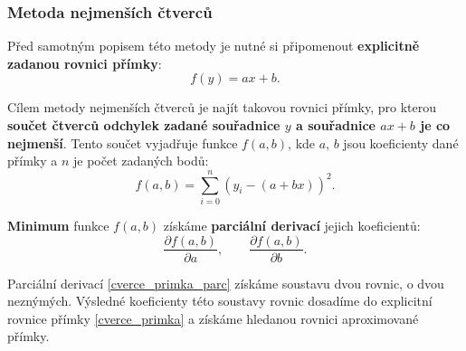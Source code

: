 \subsubsection{Metoda nejmenších čtverců}
Před samotným popisem této metody je nutné si připomenout \textbf{explicitně zadanou rovnici přímky}:
\begin{equation}\label{cverce_primka}
f(y) = ax + b.
\end{equation}

Cílem metody nejmenších čtverců je najít takovou rovnici přímky, pro kterou \textbf{součet čtverců odchylek zadané souřadnice $y$ a souřadnice $ax + b$ je co nejmenší}. Tento součet vyjadřuje funkce $f(a,b)$, kde $a$, $b$ jsou koeficienty dané přímky a $n$ je počet zadaných bodů:
\begin{equation}\label{ctverce_suma}
f(a,b) = \sum_{i=0}^{n}(y_i - (a + bx))^2.
\end{equation}

\textbf{Minimum} funkce $f(a,b)$ získáme \textbf{parciální derivací} jejich koeficientů:
\begin{equation}\label{cverce_primka_parc}
\dfrac{\partial f(a,b)}{\partial a}, \quad \quad \dfrac{\partial f(a,b)}{\partial b}.
\end{equation}

Parciální derivací \eqref{cverce_primka_parc} získáme soustavu dvou rovnic, o dvou neznýmých. Výsledné koeficienty této soustavy rovnic dosadíme do explicitní rovnice přímky \eqref{cverce_primka} a získáme hledanou rovnici aproximované přímky.
			
